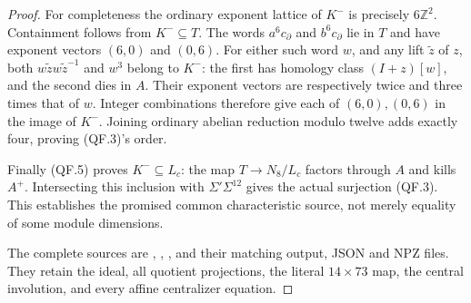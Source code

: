 \begin{proof}
For completeness the ordinary exponent lattice of
$K^-$ is precisely $6\mathbb Z^2$.  Containment
follows from $K^-\subseteq T$.  The words
$a^6c_\partial$ and $b^6c_\partial$ lie in $T$ and
have exponent vectors $(6,0)$ and $(0,6)$.
For either such word $w$, and any lift $\tilde z$
of $z$, both
$w\tilde z w\tilde z^{-1}$ and $w^3$ belong to
$K^-$: the first has homology class $(I+z)[w]$,
and the second dies in $A$.
Their exponent vectors are respectively twice and
three times that of $w$.  Integer combinations
therefore give each of $(6,0),(0,6)$ in the image
of $K^-$.  Joining ordinary abelian reduction modulo
twelve adds exactly four, proving (QF.3)'s order.

Finally (QF.5) proves $K^-\subseteq L_c$: the map
$T\to N_8/L_c$ factors through $A$ and kills $A^+$.
Intersecting this inclusion with
$\Sigma'\Sigma^{12}$ gives the actual surjection
(QF.3).  This establishes the promised common
characteristic source, not merely equality of
some module dimensions.

The complete sources are
,
,
,
and their matching output, JSON and NPZ files.
They retain the ideal, all quotient projections,
the literal $14\times73$ map, the central involution,
and every affine centralizer equation.
\end{proof}
